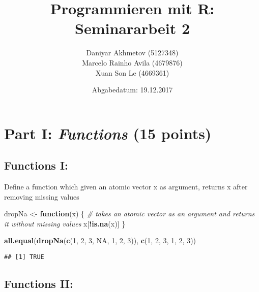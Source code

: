 \documentclass[12,]{article}
\title{Programmieren mit R: Seminararbeit 2}
\author{Daniyar Akhmetov (5127348) \\ Marcelo Rainho Avila (4679876) \\ Xuan Son Le (4669361)}
\date{Abgabedatum: 19.12.2017}
\newenvironment{Shaded}{\begin{snugshade}}{\end{snugshade}}
\newcommand{\KeywordTok}[1]{\textcolor[rgb]{0.13,0.29,0.53}{\textbf{#1}}}
\newcommand{\DecValTok}[1]{\textcolor[rgb]{0.00,0.00,0.81}{#1}}
\newcommand{\StringTok}[1]{\textcolor[rgb]{0.31,0.60,0.02}{#1}}
\newcommand{\CommentTok}[1]{\textcolor[rgb]{0.56,0.35,0.01}{\textit{#1}}}
\newcommand{\OtherTok}[1]{\textcolor[rgb]{0.56,0.35,0.01}{#1}}
\newcommand{\ControlFlowTok}[1]{\textcolor[rgb]{0.13,0.29,0.53}{\textbf{#1}}}
\newcommand{\OperatorTok}[1]{\textcolor[rgb]{0.81,0.36,0.00}{\textbf{#1}}}
\newcommand{\NormalTok}[1]{#1}
\begin{document}
\maketitle

{
\setcounter{tocdepth}{3}
\tableofcontents
}
\newpage

\section{\texorpdfstring{Part I: \emph{Functions} (15
points)}{Part I: Functions (15 points)}}\label{part-i-functions-15-points}

\subsection{Functions I:}\label{functions-i}

Define a function which given an atomic vector x as argument, returns x
after removing missing values

\begin{Shaded}
\begin{Highlighting}[]
\NormalTok{dropNa <-}\StringTok{ }\ControlFlowTok{function}\NormalTok{(x) \{}
  \CommentTok{# takes an atomic vector as an argument and returns it without missing values}
\NormalTok{  x[}\OperatorTok{!}\KeywordTok{is.na}\NormalTok{(x)]}
\NormalTok{\}}
\end{Highlighting}
\end{Shaded}

\begin{Shaded}
\begin{Highlighting}[]
\KeywordTok{all.equal}\NormalTok{(}\KeywordTok{dropNa}\NormalTok{(}\KeywordTok{c}\NormalTok{(}\DecValTok{1}\NormalTok{, }\DecValTok{2}\NormalTok{, }\DecValTok{3}\NormalTok{, }\OtherTok{NA}\NormalTok{, }\DecValTok{1}\NormalTok{, }\DecValTok{2}\NormalTok{, }\DecValTok{3}\NormalTok{)), }\KeywordTok{c}\NormalTok{(}\DecValTok{1}\NormalTok{, }\DecValTok{2}\NormalTok{, }\DecValTok{3}\NormalTok{, }\DecValTok{1}\NormalTok{, }\DecValTok{2}\NormalTok{, }\DecValTok{3}\NormalTok{))}
\end{Highlighting}
\end{Shaded}

\begin{verbatim}
## [1] TRUE
\end{verbatim}

\subsection{Functions II:}\label{functions-ii}
\end{document}
